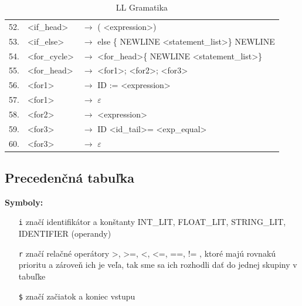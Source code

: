 \documentclass[a4paper,11pt]{article}
\begin{document}
\begin{table}[h!]
\begin{center}
\begin{scriptsize}
\begin{tabular}{lll}
    					52. &\textless if\_head\textgreater  	   & $\rightarrow$ ( \textless expression\textgreater  )\\
    					53. &\textless if\_else\textgreater  	   & $\rightarrow$ else \{ NEWLINE \textless statement\_list\textgreater  \} NEWLINE\\
    					54. &\textless for\_cycle\textgreater  	   & $\rightarrow$ \textless for\_head\textgreater  \{ NEWLINE \textless statement\_list\textgreater  \}\\
    					55. &\textless for\_head\textgreater  	   & $\rightarrow$ \textless for1\textgreater  ; \textless for2\textgreater  ; \textless for3\textgreater \\
    					56. &\textless for1\textgreater  	   	   & $\rightarrow$ ID := \textless expression\textgreater \\
    					57. &\textless for1\textgreater  	  	   & $\rightarrow$ $\varepsilon$\\
    					58. &\textless for2\textgreater  		   & $\rightarrow$ \textless expression\textgreater \\
    					59. &\textless for3\textgreater  		   & $\rightarrow$ ID \textless id\_tail\textgreater  = \textless exp\_equal\textgreater \\
    					60. &\textless for3\textgreater  		   & $\rightarrow$ $\varepsilon$\\
					\end{tabular}
					\end{scriptsize}
					\caption{LL Gramatika}
					\label{tab:llgram}
				\end{center}
			\end{table}
		\cleardoublepage

		\subsection{Precedenčná tabuľka}\label{subsec:prectab}

			{\bfseries Symboly:}\\
			\begin{itemize}
		 		\item [\texttt{\large i}\hspace{5mm}] značí identifikátor a konštanty INT\_LIT, FLOAT\_LIT, STRING\_LIT, IDENTIFIER (operandy)\\
				\item [\texttt{\large r}\hspace{5mm}] značí relačné operátory \textgreater, \textgreater=, \textless, \textless=, ==, != , ktoré majú rovnakú prioritu a zároveň ich je veľa, tak sme sa ich rozhodli dať do jednej skupiny v tabuľke\\
				\item [\texttt{\large \$}\hspace{5mm}] značí začiatok a koniec vstupu\\
			\end{itemize}
\end{document}
